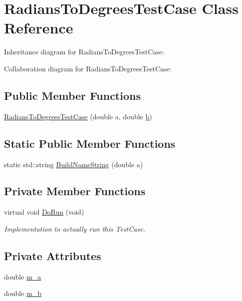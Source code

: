 \hypertarget{classRadiansToDegreesTestCase}{}\section{Radians\+To\+Degrees\+Test\+Case Class Reference}
\label{classRadiansToDegreesTestCase}


Inheritance diagram for Radians\+To\+Degrees\+Test\+Case\+:


Collaboration diagram for Radians\+To\+Degrees\+Test\+Case\+:
\subsection*{Public Member Functions}
\begin{DoxyCompactItemize}
\item 
\hyperlink{classRadiansToDegreesTestCase_a959887f19700ba1214cbed46f7f303d3}{Radians\+To\+Degrees\+Test\+Case} (double a, double \hyperlink{lte__pathloss_8m_a21ad0bd836b90d08f4cf640b4c298e7c}{b})
\end{DoxyCompactItemize}
\subsection*{Static Public Member Functions}
\begin{DoxyCompactItemize}
\item 
static std\+::string \hyperlink{classRadiansToDegreesTestCase_a92910a50bf27d813a9172221c3e51c61}{Build\+Name\+String} (double a)
\end{DoxyCompactItemize}
\subsection*{Private Member Functions}
\begin{DoxyCompactItemize}
\item 
virtual void \hyperlink{classRadiansToDegreesTestCase_a61330bbc69a5fca35167e751c3ebfc53}{Do\+Run} (void)
\begin{DoxyCompactList}\small\item\em Implementation to actually run this Test\+Case. \end{DoxyCompactList}\end{DoxyCompactItemize}
\subsection*{Private Attributes}
\begin{DoxyCompactItemize}
\item 
double \hyperlink{classRadiansToDegreesTestCase_a895d73fe5bd1f62c14bc27b8fccf3c80}{m\+\_\+a}
\item 
double \hyperlink{classRadiansToDegreesTestCase_af5855c27ab691f809ff4ed96cb8eff8a}{m\+\_\+b}
\end{DoxyCompactItemize}

